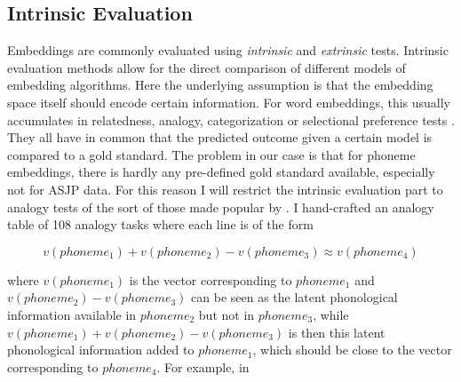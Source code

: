 \documentclass[11pt]{article}
\begin{document}
\subsection{Intrinsic Evaluation}
\label{Intrinsic Evaluation}

Embeddings are commonly evaluated using \textit{intrinsic} and \textit{extrinsic} tests.
Intrinsic evaluation methods allow for the direct comparison of different models of embedding algorithms. Here the underlying assumption is that the embedding space itself should encode certain information. For word embeddings, this usually accumulates in relatedness, analogy, categorization or selectional preference tests \cite{schnabel2015evaluation}. They all have in common that the predicted outcome given a certain model is compared to a gold standard. The problem in our case is that for phoneme embeddings, there is hardly any pre-defined gold standard available, especially not for ASJP data. For this reason I will restrict the intrinsic evaluation part to analogy tests of the sort of those made popular by \cite{mikolov2013distributed}. I hand-crafted an analogy table of 108 analogy tasks where each line is of the form 

\begin{equation}
v(phoneme_1) + v(phoneme_2) -  v(phoneme_3) \approx v(phoneme_4)
\end{equation}

where $v(phoneme_1)$ is the vector corresponding to $phoneme_1$ and $v(phoneme_2) - v(phoneme_3)$ can be seen as the latent phonological information available in $phoneme_2$ but not in $phoneme_3$,  while $v(phoneme_1) + v(phoneme_2) -  v(phoneme_3) $ is then this latent phonological information added to $phoneme_1$, which should be close to the vector corresponding to $phoneme_4$. For example, in
\end{document}
